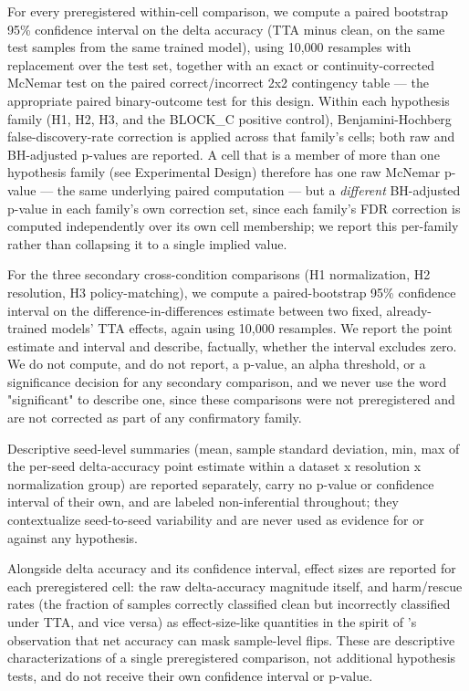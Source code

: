 For every preregistered within-cell comparison, we compute a paired bootstrap 95\% confidence interval on the delta accuracy (TTA minus clean, on the same test samples from the same trained model), using 10,000 resamples with replacement over the test set, together with an exact or continuity-corrected McNemar test on the paired correct/incorrect 2x2 contingency table --- the appropriate paired binary-outcome test for this design. Within each hypothesis family (H1, H2, H3, and the BLOCK\_C positive control), Benjamini-Hochberg false-discovery-rate correction is applied across that family's cells; both raw and BH-adjusted p-values are reported. A cell that is a member of more than one hypothesis family (see Experimental Design) therefore has one raw McNemar p-value --- the same underlying paired computation --- but a \emph{different} BH-adjusted p-value in each family's own correction set, since each family's FDR correction is computed independently over its own cell membership; we report this per-family rather than collapsing it to a single implied value.

For the three secondary cross-condition comparisons (H1 normalization, H2 resolution, H3 policy-matching), we compute a paired-bootstrap 95\% confidence interval on the difference-in-differences estimate between two fixed, already-trained models' TTA effects, again using 10,000 resamples. We report the point estimate and interval and describe, factually, whether the interval excludes zero. We do not compute, and do not report, a p-value, an alpha threshold, or a significance decision for any secondary comparison, and we never use the word "significant" to describe one, since these comparisons were not preregistered and are not corrected as part of any confirmatory family.

Descriptive seed-level summaries (mean, sample standard deviation, min, max of the per-seed delta-accuracy point estimate within a dataset x resolution x normalization group) are reported separately, carry no p-value or confidence interval of their own, and are labeled non-inferential throughout; they contextualize seed-to-seed variability and are never used as evidence for or against any hypothesis.

Alongside delta accuracy and its confidence interval, effect sizes are reported for each preregistered cell: the raw delta-accuracy magnitude itself, and harm/rescue rates (the fraction of samples correctly classified clean but incorrectly classified under TTA, and vice versa) as effect-size-like quantities in the spirit of \citet{shanmugam2021better}'s observation that net accuracy can mask sample-level flips. These are descriptive characterizations of a single preregistered comparison, not additional hypothesis tests, and do not receive their own confidence interval or p-value.

